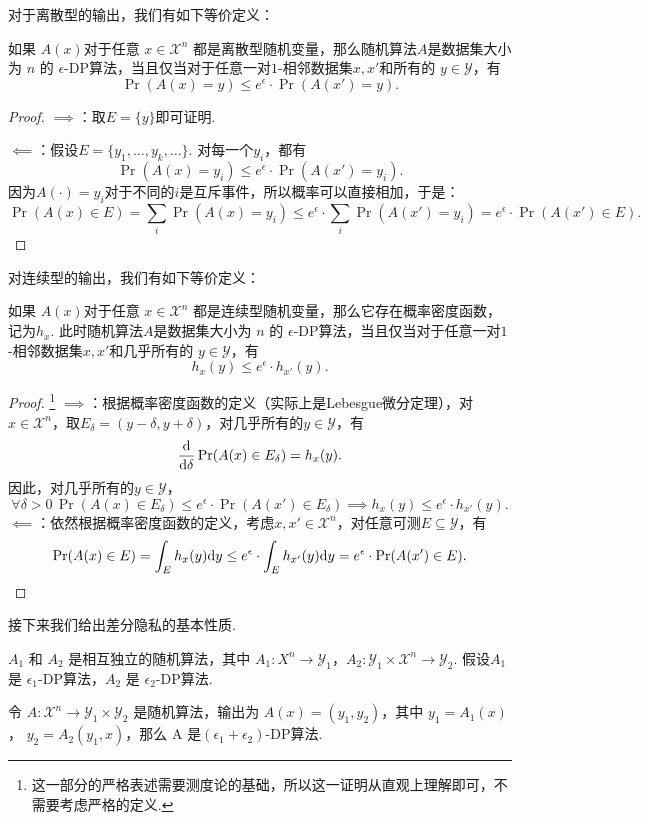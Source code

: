 对于离散型的输出，我们有如下等价定义：
\begin{proposition}\label{prop:discrete-dp}
    如果 $A(x)$对于任意 $x \in \mathcal X^n$ 都是离散型随机变量，那么随机算法$A$是数据集大小为 $n$ 的 $\epsilon$-DP算法，当且仅当对于任意一对$1$-相邻数据集$x, x'$和所有的 $y \in \mathcal Y$，有
    \[
    \Pr(A(x) = y) \leq e^{\epsilon} \cdot \Pr(A(x') = y).
    \]
\end{proposition}
\begin{proof}
$\implies$：取$E = \{y\}$即可证明.

$\impliedby$：假设$E=\{y_1,\dots,y_k,\dots\}$. 对每一个$y_i$，都有
    \[
    \Pr(A(x) = y_i) \leq e^{\epsilon} \cdot \Pr(A(x') = y_i).
    \]
因为$A(\cdot)=y_i$对于不同的$i$是互斥事件，所以概率可以直接相加，于是：
    \[
    \Pr(A(x) \in E) = \sum_i \Pr(A(x) = y_i) \leq e^{\epsilon} \cdot \sum_i\Pr(A(x') = y_i) = e^{\epsilon} \cdot \Pr(A(x') \in E).
    \]
\end{proof}

对连续型的输出，我们有如下等价定义：
\begin{proposition}\label{prop:continuous-dp}
如果 $A(x)$对于任意 $x \in \mathcal X^n$ 都是连续型随机变量，那么它存在概率密度函数，记为$h_{x}$. 此时随机算法$A$是数据集大小为 $n$ 的 $\epsilon$-DP算法，当且仅当对于任意一对$1$-相邻数据集$x, x'$和几乎所有的 $y \in \mathcal Y$，有
    \[
    h_{x}(y) \leq e^{\epsilon} \cdot h_{x'}(y).
    \]
\end{proposition}
\begin{proof}\footnote{这一部分的严格表述需要测度论的基础，所以这一证明从直观上理解即可，不需要考虑严格的定义. }
$\implies$：根据概率密度函数的定义（实际上是Lebesgue微分定理），对$x\in\mathcal X^n$，取$E_\delta = (y-\delta, y+\delta)$，对几乎所有的$y\in\mathcal Y$，有
\[\frac{\mathrm{d}}{\mathrm{d}\delta}\Pr(A(x)\in E_\delta)=h_x(y).\]
因此，对几乎所有的$y\in\mathcal Y$，
\[\forall\delta>0\,\Pr(A(x)\in E_\delta) \leq e^{\epsilon} \cdot \Pr(A(x')\in E_\delta)\implies h_x(y)\leq e^\epsilon\cdot h_{x'}(y).\]
$\impliedby$：依然根据概率密度函数的定义，考虑$x,x'\in\mathcal X^n$，对任意可测$E\subseteq\mathcal Y$，有
\[\Pr(A(x)\in E)=\int_E h_x(y)\mathrm{d} y\leq e^\epsilon\cdot\int_E h_{x'}(y)\mathrm{d} y=e^\epsilon\cdot\Pr(A(x')\in E).\]
\end{proof}

接下来我们给出差分隐私的基本性质. 

\begin{proposition}\label{prop:composition}
    $A_1$ 和 $A_2$ 是相互独立的随机算法，其中 $A_1 : X^n \to \mathcal Y_1$，$A_2 : \mathcal Y_1 \times \mathcal X^n \to \mathcal Y_2$. 假设$A_1$是 $\epsilon_1$-DP算法，$A_2$ 是 $\epsilon_2$-DP算法.
    
    令 $A :\mathcal X^n \to \mathcal Y_1 \times \mathcal Y_2$ 是随机算法，输出为 $A(x) = (y_1, y_2)$，其中 $y_1 = A_1(x)$， $y_2 = A_2(y_1, x)$，那么 A 是$(\epsilon_1 + \epsilon_2)$-DP算法.
\end{proposition}

